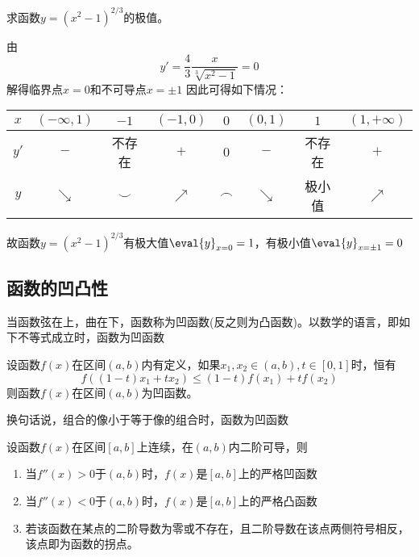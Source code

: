 \begin{example}
    求函数$y=(x^2-1)^{2/3}$的极值。
\end{example}
\begin{solution}
    由
    \[ y'=\frac{4}{3}\frac{x}{\sqrt[3]{x^2-1}}=0 \]
    解得临界点$x=0$和不可导点$x=\pm 1$
    因此可得如下情况：
    \begin{center}
        \begin{tabular}{|c|c|c|c|c|c|c|c|}
            \hline
            $x$  & $(-\infty,1)$ & $-1$     & $(-1,0)$   & $0$      & $(0,1)$    & $1$    & $(1,+\infty)$ \\ \hline
            $y'$ & $-$           & 不存在   & $+$        & $0$      & $-$        & 不存在 & $+$           \\ \hline
            $y$  & $\searrow$    & $\smile$ & $\nearrow$ & $\frown$ & $\searrow$ & 极小值 & $\nearrow$    \\ \hline
        \end{tabular}
    \end{center}
    故函数$y=(x^2-1)^{2/3}$有极大值$\eval{y}_{x=0}=1$，有极小值$\eval{y}_{x=\pm 1}=0$
\end{solution}

\subsection{函数的凹凸性}
当函数弦在上，曲在下，函数称为凹函数(反之则为凸函数)。以数学的语言，即如下不等式成立时，函数为凹函数
\begin{definition}
    设函数$f(x)$在区间$(a,b)$内有定义，如果$x_1,x_2\in(a,b), t \in [0,1]$时，恒有
    \[ f((1-t)x_1+tx_2)\leq (1-t)f(x_1)+tf(x_2) \]
    则函数$f(x)$在区间$(a,b)$为凹函数。
\end{definition}
换句话说，组合的像小于等于像的组合时，函数为凹函数

\begin{theorem}
    设函数$f(x)$在区间$[a,b]$上连续，在$(a,b)$内二阶可导，则
    \begin{enumerate}
        \item 当$f''(x)>0$于$(a,b)$时，$f(x)$是$[a,b]$上的严格凹函数
        \item 当$f''(x)<0$于$(a,b)$时，$f(x)$是$[a,b]$上的严格凸函数
        \item 若该函数在某点的二阶导数为零或不存在，且二阶导数在该点两侧符号相反，该点即为函数的拐点。
    \end{enumerate}
\end{theorem}

